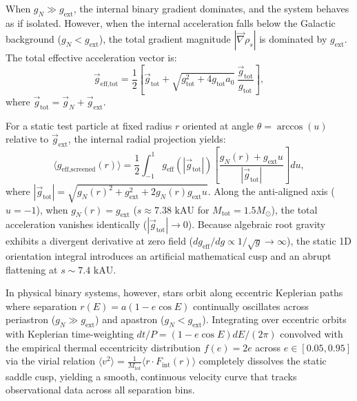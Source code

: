 \documentclass[aps,prd,reprint,superscriptaddress,nofootinbib,floatfix,amsmath,amssymb]{revtex4-2}
\begin{document}
When $g_N \gg g_{\text{ext}}$, the internal binary gradient dominates, and the system behaves as if isolated. However, when the internal acceleration falls below the Galactic background ($g_N < g_{\text{ext}}$), the total gradient magnitude $|\vec{\nabla}\rho_s|$ is dominated by $g_{\text{ext}}$. The total effective acceleration vector is:
\begin{equation}
\vec{g}_{\text{eff,tot}} = \frac{1}{2} \left[ \vec{g}_{\text{tot}} + \sqrt{g_{\text{tot}}^2 + 4 g_{\text{tot}} a_0} \, \frac{\vec{g}_{\text{tot}}}{g_{\text{tot}}} \right],
\end{equation}
where $\vec{g}_{\text{tot}} = \vec{g}_N + \vec{g}_{\text{ext}}$. 

For a static test particle at fixed radius $r$ oriented at angle $\theta = \arccos(u)$ relative to $\vec{g}_{\text{ext}}$, the internal radial projection yields:
\begin{equation}
\langle g_{\text{eff,screened}}(r) \rangle = \frac{1}{2} \int_{-1}^1 g_{\text{eff}}(|\vec{g}_{\text{tot}}|) \left[ \frac{g_N(r) + g_{\text{ext}} u}{|\vec{g}_{\text{tot}}|} \right] du,
\label{eq:g_eff_static_vec}
\end{equation}
where $|\vec{g}_{\text{tot}}| = \sqrt{g_N(r)^2 + g_{\text{ext}}^2 + 2 g_N(r) g_{\text{ext}} u}$. Along the anti-aligned axis ($u = -1$), when $g_N(r) = g_{\text{ext}}$ ($s \approx 7.38\text{ kAU}$ for $M_{\text{tot}} = 1.5 M_\odot$), the total acceleration vanishes identically ($|\vec{g}_{\text{tot}}| \to 0$). Because algebraic root gravity exhibits a divergent derivative at zero field ($d g_{\text{eff}} / d g \propto 1/\sqrt{g} \to \infty$), the static 1D orientation integral introduces an artificial mathematical cusp and an abrupt flattening at $s \sim 7.4\text{ kAU}$.

In physical binary systems, however, stars orbit along eccentric Keplerian paths where separation $r(E) = a(1 - e\cos E)$ continually oscillates across periastron ($g_N \gg g_{\text{ext}}$) and apastron ($g_N < g_{\text{ext}}$). Integrating over eccentric orbits with Keplerian time-weighting $dt/P = (1 - e\cos E) dE / (2\pi)$ convolved with the empirical thermal eccentricity distribution $f(e) = 2e$ across $e \in [0.05, 0.95]$ via the virial relation $\langle v^2 \rangle = \frac{1}{M_{\text{tot}}} \langle r \cdot F_{\text{int}}(r) \rangle$ completely dissolves the static saddle cusp, yielding a smooth, continuous velocity curve that tracks observational data across all separation bins.
\end{document}
